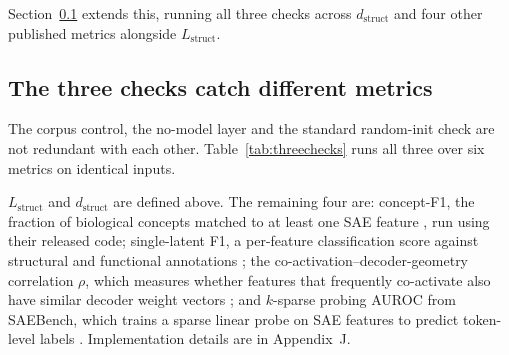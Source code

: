 \documentclass{article} %
\newcommand{\Lstruct}{\ensuremath{L_{\mathrm{struct}}}}
\newcommand{\dstruct}{\ensuremath{d_{\mathrm{struct}}}}
\begin{document}
Section~\ref{sec:threechecks} extends this, running all three checks across \dstruct{} and four
other published metrics alongside \Lstruct.

\subsection{The three checks catch different metrics}
\label{sec:threechecks}

The corpus control, the no-model layer and the standard random-init check are not redundant with
each other. Table~\ref{tab:threechecks} runs all three over six metrics on identical inputs.

\Lstruct{} and \dstruct{} are defined above. The remaining four are: concept-F1, the fraction of
biological concepts matched to at least one SAE feature \citep{simon2025interplm}, run using their
released code; single-latent F1, a per-feature classification score against structural and
functional annotations \citep{adams2025mechanistic}; the co-activation--decoder-geometry
correlation $\rho$, which measures whether features that frequently co-activate also have similar
decoder weight vectors \citep{li2025geometry}; and $k$-sparse probing AUROC from SAEBench, which
trains a sparse linear probe on SAE features to predict token-level labels
\citep{karvonen2025saebench}. Implementation details are in Appendix~J.
\end{document}

